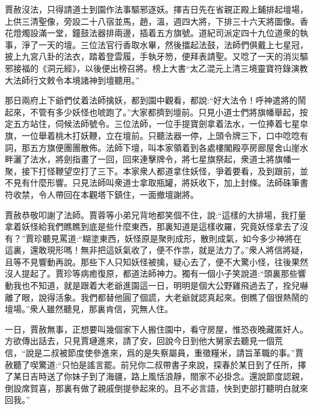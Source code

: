 \begin{parag}
    賈赦沒法，只得請道士到園作法事驅邪逐妖。擇吉日先在省親正殿上鋪排起壇場，上供三清聖像，旁設二十八宿並馬，趙，溫，週四大將，下排三十六天將圖像。香花燈燭設滿一堂，鐘鼓法器排兩邊，插着五方旗號。道紀司派定四十九位道衆的執事，淨了一天的壇。三位法官行香取水畢，然後擂起法鼓，法師們俱戴上七星冠，披上九宮八卦的法衣，踏着登雲履，手執牙笏，便拜表請聖。又唸了一天的消災驅邪接福的《洞元經》，以後便出榜召將。榜上大書“太乙混元上清三境靈寶符錄演教大法師行文敕令本境諸神到壇聽用。”
\end{parag}


\begin{parag}
    那日兩府上下爺們仗着法師擒妖，都到園中觀看，都說:“好大法令！呼神遣將的鬧起來，不管有多少妖怪也唬跑了。”大家都擠到壇前。只見小道士們將旗幡舉起，按定五方站住，伺候法師號令。三位法師，一位手提寶劍拿着法水，一位捧着七星皁旗，一位舉着桃木打妖鞭，立在壇前。只聽法器一停，上頭令牌三下，口中唸唸有詞，那五方旗便團團散佈。法師下壇，叫本家領着到各處樓閣殿亭房廊屋舍山崖水畔灑了法水，將劍指畫了一回，回來連擊牌令，將七星旗祭起，衆道士將旗幡一聚，接下打怪鞭望空打了三下。本家衆人都道拿住妖怪，爭着要看，及到跟前，並不見有什麼形響。只見法師叫衆道士拿取瓶罐，將妖收下，加上封條。法師硃筆書符收禁，令人帶回在本觀塔下鎮住，一面撤壇謝將。
\end{parag}


\begin{parag}
    賈赦恭敬叩謝了法師。賈蓉等小弟兄背地都笑個不住，說:“這樣的大排場，我打量拿着妖怪給我們瞧瞧到底是些什麼東西，那裏知道是這樣收羅，究竟妖怪拿去了沒有？”賈珍聽見罵道:“糊塗東西，妖怪原是聚則成形，散則成氣，如今多少神將在這裏，還敢現形嗎！無非把這妖氣收了，便不作祟，就是法力了。”衆人將信將疑，且等不見響動再說。那些下人只知妖怪被擒，疑心去了，便不大驚小怪，往後果然沒人提起了。賈珍等病癒復原，都道法師神力。獨有一個小子笑說道:“頭裏那些響動我也不知道，就是跟着大老爺進園這一日，明明是個大公野雞飛過去了，拴兒嚇離了眼，說得活象。我們都替他圓了個謊，大老爺就認真起來。倒瞧了個很熱鬧的壇場。”衆人雖然聽見，那裏肯信，究無人住。
\end{parag}


\begin{parag}
    一日，賈赦無事，正想要叫幾個家下人搬住園中，看守房屋，惟恐夜晚藏匿奸人。方欲傳出話去，只見賈璉進來，請了安，回說今日到他大舅家去聽見一個荒信，“說是二叔被節度使參進來，爲的是失察屬員，重徵糧米，請旨革職的事。”賈赦聽了喫驚道:“只怕是謠言罷。前兒你二叔帶書子來說，探春於某日到了任所，擇了某日吉時送了你妹子到了海疆，路上風恬浪靜，閤家不必掛念。還說節度認親，倒設席賀喜，那裏有做了親戚倒提參起來的。且不必言語，快到吏部打聽明白就來回我。”
\end{parag}


